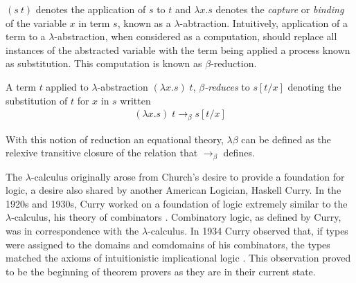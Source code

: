 $(s \: t)$ denotes the application of $s$ to $t$ and $\lambda x . s $ denotes
the \textit{capture} or \textit{binding} of the variable $x$ in term $s$, known
as a $\lambda$-abtraction. Intuitively, application of a term to a
$\lambda$-abstraction, when considered as a computation, should replace all
instances of the abstracted variable with the term being applied a process known
as substitution. This computation is known as $\beta$-reduction.


\begin{definition*} A term $t$ applied to
    $\lambda$-abstraction $(\lambda x . s) \; t$, $\beta$\textit{-reduces} to
    $s[t/x]$ denoting the substitution of $t$ for $x$ in $s$ written
    \begin{align*}
        (\lambda x . s) \; t \rightarrow_{\beta} s[t/x]
    \end{align*}
\end{definition*}
With this notion of reduction an equational theory, $\lambda\beta$ can be
defined as the relexive transitive closure of the relation that
$\rightarrow_{\beta}$ defines.

The $\lambda$-calculus originally arose from Church's desire to provide a foundation
for logic, a desire also shared by another American Logician, Haskell Curry. In
the 1920s and 1930s, Curry worked on a foundation of logic extremely similar to
the $\lambda$-calculus, his theory of combinators \cite{curry1930grundlagen}.
Combinatory logic, as defined by Curry, was in correspondence with the
$\lambda$-calculus. In 1934 Curry observed that, if types were assigned to the
domains and comdomains of his combinators, the types matched the axioms of
intuitionistic implicational logic \cite{curry1934functionality}. This
observation proved to be the beginning of theorem provers as they are in their
current state.

